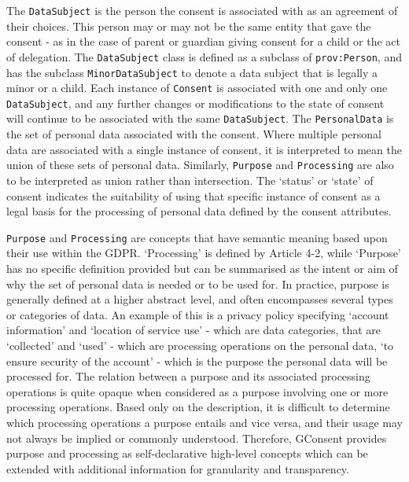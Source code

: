 The \texttt{DataSubject} is the person the consent is associated with as an agreement of their choices. This person may or may not be the same entity that gave the consent - as in the case of parent or guardian giving consent for a child or the act of delegation. The \texttt{DataSubject} class is defined as a subclass of \texttt{prov:Person}, and has the subclass \texttt{MinorDataSubject} to denote a data subject that is legally a minor or a child.
Each instance of \texttt{Consent} is associated with one and only one \texttt{DataSubject}, and any further changes or modifications to the state of consent will continue to be associated with the same \texttt{DataSubject}.
The \texttt{PersonalData} is the set of personal data associated with the consent. Where multiple personal data are associated with a single instance of consent, it is interpreted to mean the union of these sets of personal data. Similarly, \texttt{Purpose} and \texttt{Processing} are also to be interpreted as union rather than intersection.
The `status' or `state' of consent indicates the suitability of using that specific instance of consent as a legal basis for the processing of personal data defined by the consent attributes.

\texttt{Purpose} and \texttt{Processing} are concepts that have semantic meaning based upon their use within the GDPR.
`Processing' is defined by Article 4-2, while `Purpose' has no specific definition provided but can be summarised as the intent or aim of why the set of personal data is needed or to be used for. In practice, purpose is generally defined at a higher abstract level, and often encompasses several types or categories of data. An example of this is a privacy policy specifying `account information' and `location of service use' - which are data categories, that are `collected' and `used' - which are processing operations on the personal data, `to ensure security of the account' - which is the purpose the personal data will be processed for. The relation between a purpose and its associated processing operations is quite opaque when considered as a purpose involving one or more processing operations. Based only on the description, it is difficult to determine which processing operations a purpose entails and vice versa, and their usage may not always be implied or commonly understood. Therefore, GConsent provides purpose and processing as self-declarative high-level concepts which can be extended with additional information for granularity and transparency.

